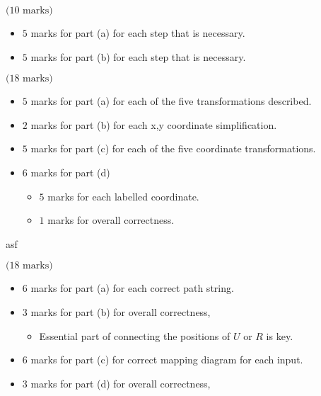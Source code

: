 \documentclass[12pt]{article} %
\begin{document}
\begin{qstn} $\text{(10 marks)}$
   \begin{itemize}
     \item $5$ marks for part (a) for each step that is necessary.
     \item $5$ marks for part (b) for each step that is necessary.
   \end{itemize}
  
\end{qstn}

\begin{qstn} $\text{(18 marks)}$
   \begin{itemize}
     \item $5$ marks for part (a) for each of the five transformations described.
     \item $2$ marks for part (b) for each x,y coordinate simplification.
     \item $5$ marks for part (c) for each of the five coordinate transformations.
     \item $6$ marks for part (d)
      \begin{itemize}
        \item $5$ marks for each labelled coordinate.
        \item $1$ marks for overall correctness.
      \end{itemize}
   \end{itemize}
  
\end{qstn}

\begin{qstn}
  asf
\end{qstn}

\begin{qstn} $\text{(18 marks)}$
   \begin{itemize}
     \item $6$ marks for part (a) for each correct path string.
     \item $3$ marks for part (b) for overall correctness,
      \begin{itemize}
        \item Essential part of connecting the positions of $U$ or $R$ is key.
      \end{itemize}
     \item $6$ marks for part (c) for correct mapping diagram for each input.
     \item $3$ marks for part (d) for overall correctness,
   \end{itemize}
  
\end{qstn}
\end{document}
